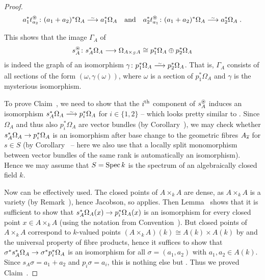 \documentclass[a4paper,parskip=half,numbers=enddot, DIV=12]{scrreprt}
\begin{document}
\begin{proof}
	\begin{align}\lbl{eq:a1a2}
		a_1^*t_{a_2}^\oast\colon (a_1+a_2)^*\Omega_A\isomorphism a_1^*\Omega_A\quad\text{and}\quad a_2^*t_{a_1}^\oast\colon (a_1+a_2)^*\Omega_A\isomorphism a_2^*\Omega_A\;.
	\end{align}
	\begin{claim}
		This shows that the image $\Gamma_A$ of 
		\begin{align*}
			s_A^\oast\colon s_A^*\Omega_A\morphism \Omega_{A\times_SA}\cong p_1^*\Omega_A\oplus p_2^*\Omega_A
		\end{align*}
		is indeed the graph of an isomorphism $\gamma\colon p_1^*\Omega_A\isomorphism p_2^*\Omega_A$. That is, $\Gamma_A$ consists of all sections of the form $(\omega,\gamma(\omega))$, where $\omega$ is a section of $p_1^*\Omega_A$ and $\gamma$ is the mysterious isomorphism.
	\end{claim}
	To prove Claim~, we need to show that the $i^{\text{th}}$ component of $s_A^\oast$ induces an isomorphism $s_A^*\Omega_A\isomorphism p_i^*\Omega_A$ for $i\in\{1,2\}$ -- which looks pretty similar to . Since $\Omega_A$ and thus also $p_i^*\Omega_A$ are vector bundles (by Corollary~), we may check whether $s_A^*\Omega_A\morphism p_i^*\Omega_A$ is an isomorphism after base change to the geometric fibres $A_{\overline{s}}$ for $s\in S$ (by Corollary~ -- here we also use that a locally split monomorphism between vector bundles of the same rank is automatically an isomorphism). Hence we may assume that $S=\operatorname{Spec} k$ is the spectrum of an algebraically closed field $k$.
	
	Now  can be effectively used. The closed points of $A\times_kA$ are dense, as $A\times_kA$ is a variety (by Remark~), hence Jacobson, so \cite[Fact~2.4.1]{alggeo1} applies. Then Lemma~ shows that it is sufficient  to show that $s_A^*\Omega_A(x)\morphism p_i^*\Omega_A(x)$ is an isomorphism for every closed point $x\in A\times_kA$ (using the notation from Convention~). But closed points of $A\times_kA$ correspond to $k$-valued points $(A\times_kA)(k)\cong A(k)\times A(k)$ by  and the universal property of fibre products, hence it suffices to show that $\sigma^*s_A^*\Omega_A\morphism \sigma^*p_i^*\Omega_A$ is an isomorphism for all $\sigma=(a_1,a_2)$ with $a_1,a_2\in A(k)$. Since $s_A\sigma=a_1+a_2$ and $p_i\sigma=a_i$, this is nothing else but . Thus we proved Claim~.
	

\end{proof}
\end{document}
